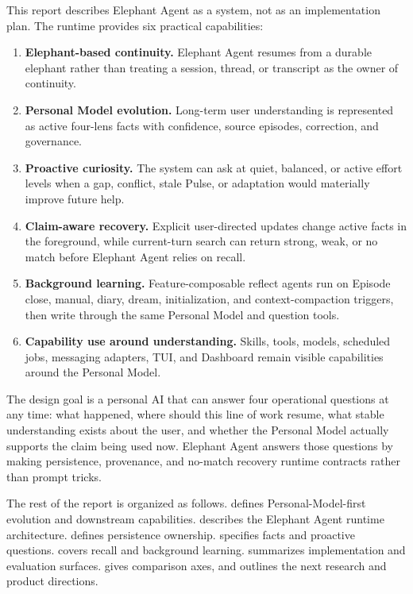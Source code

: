 This report describes Elephant Agent as a system, not as an implementation plan. The
runtime provides six practical capabilities:

\begin{enumerate}[leftmargin=*]
  \item \textbf{Elephant-based continuity.} Elephant Agent resumes from a durable elephant rather
  than treating a session, thread, or transcript as the owner of continuity.

  \item \textbf{Personal Model evolution.} Long-term user understanding is
  represented as active four-lens facts with confidence, source episodes,
  correction, and governance.

  \item \textbf{Proactive curiosity.} The system can ask at quiet, balanced, or
  active effort levels when a gap, conflict, stale Pulse, or adaptation would
  materially improve future help.

  \item \textbf{Claim-aware recovery.} Explicit user-directed updates change
  active facts in the foreground, while current-turn search can return strong,
  weak, or no match before Elephant Agent relies on recall.

  \item \textbf{Background learning.} Feature-composable reflect agents run on
  Episode close, manual, diary, dream, initialization, and context-compaction
  triggers, then write through the same Personal Model and question tools.

  \item \textbf{Capability use around understanding.} Skills, tools, models,
  scheduled jobs, messaging adapters, TUI, and Dashboard remain visible capabilities
  around the Personal Model.
\end{enumerate}

The design goal is a personal AI that can answer four operational questions at
any time: what happened, where should this line of work resume, what stable
understanding exists about the user, and whether the Personal Model actually
supports the claim being used now. Elephant Agent answers those questions by making
persistence, provenance, and no-match recovery runtime contracts rather than
prompt tricks.

The rest of the report is organized as follows. 
defines Personal-Model-first evolution and downstream capabilities.
 describes the Elephant Agent runtime architecture.
 defines persistence ownership.
 specifies facts and proactive questions.
 covers recall and background learning.
 summarizes implementation and evaluation
surfaces.  gives comparison axes, and
 outlines the next research and product directions.
